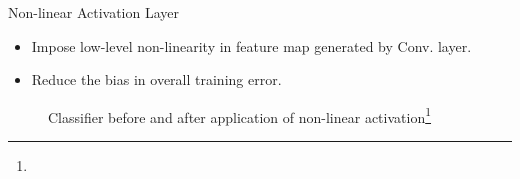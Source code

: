 \documentclass[10pt]{beamer}
\begin{document}
\begin{frame}{Non-linear Activation Layer}
 \begin{itemize}
     \item Impose low-level non-linearity in feature map generated by Conv. layer.
     \item Reduce the bias in overall training error. 
 \end{itemize}
 
 \begin{figure}
    \centering
    \caption{Classifier before and after application of non-linear activation\footnote[frame]{}}
\end{figure} 
\end{frame}
\end{document}
